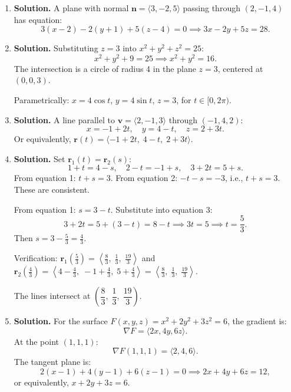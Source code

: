 \begin{enumerate}
\item \textbf{Solution.}
A plane with normal \( \mathbf{n} = \langle 3, -2, 5 \rangle \) passing through \( (2, -1, 4) \) has equation:
\[
3(x - 2) - 2(y + 1) + 5(z - 4) = 0 \implies 3x - 2y + 5z = 28.
\]

\item \textbf{Solution.}
Substituting \( z = 3 \) into \( x^2 + y^2 + z^2 = 25 \):
\[
x^2 + y^2 + 9 = 25 \implies x^2 + y^2 = 16.
\]
The intersection is a circle of radius 4 in the plane \( z = 3 \), centered at \( (0, 0, 3) \).

Parametrically: \( x = 4\cos t \), \( y = 4\sin t \), \( z = 3 \), for \( t \in [0, 2\pi) \).

\item \textbf{Solution.}
A line parallel to \( \mathbf{v} = \langle 2, -1, 3 \rangle \) through \( (-1, 4, 2) \):
\[
x = -1 + 2t, \quad y = 4 - t, \quad z = 2 + 3t.
\]
Or equivalently, \( \mathbf{r}(t) = \langle -1 + 2t,\; 4 - t,\; 2 + 3t \rangle \).

\item \textbf{Solution.}
Set \( \mathbf{r}_1(t) = \mathbf{r}_2(s) \):
\[
1 + t = 4 - s, \quad 2 - t = -1 + s, \quad 3 + 2t = 5 + s.
\]
From equation 1: \( t + s = 3 \). From equation 2: \( -t - s = -3 \), i.e., \( t + s = 3 \). These are consistent.

From equation 1: \( s = 3 - t \). Substitute into equation 3:
\[
3 + 2t = 5 + (3 - t) = 8 - t \implies 3t = 5 \implies t = \frac{5}{3}.
\]
Then \( s = 3 - \frac{5}{3} = \frac{4}{3} \).

Verification: \( \mathbf{r}_1\!\left(\frac{5}{3}\right) = \left\langle \frac{8}{3},\; \frac{1}{3},\; \frac{19}{3} \right\rangle \) and \( \mathbf{r}_2\!\left(\frac{4}{3}\right) = \left\langle 4 - \frac{4}{3},\; -1 + \frac{4}{3},\; 5 + \frac{4}{3} \right\rangle = \left\langle \frac{8}{3},\; \frac{1}{3},\; \frac{19}{3} \right\rangle \).

The lines intersect at \( \left(\dfrac{8}{3},\; \dfrac{1}{3},\; \dfrac{19}{3}\right) \).

\item \textbf{Solution.}
For the surface \( F(x,y,z) = x^2 + 2y^2 + 3z^2 = 6 \), the gradient is:
\[
\nabla F = \langle 2x, 4y, 6z \rangle.
\]
At the point \( (1, 1, 1) \):
\[
\nabla F(1,1,1) = \langle 2, 4, 6 \rangle.
\]
The tangent plane is:
\[
2(x - 1) + 4(y - 1) + 6(z - 1) = 0 \implies 2x + 4y + 6z = 12,
\]
or equivalently, \( x + 2y + 3z = 6 \).


\end{enumerate}
